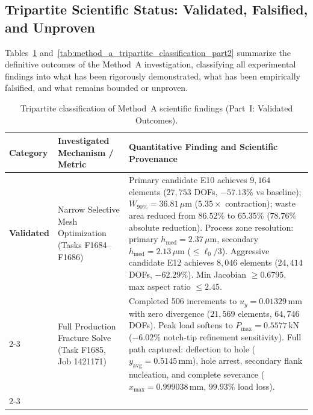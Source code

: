\subsection{Tripartite Scientific Status: Validated, Falsified, and Unproven}
\label{subsec:method_a_tripartite_status}

Tables~\ref{tab:method_a_tripartite_classification} and~\ref{tab:method_a_tripartite_classification_part2} summarize the definitive outcomes of the Method~A investigation, classifying all experimental findings into what has been rigorously demonstrated, what has been empirically falsified, and what remains bounded or unproven.

\begin{table}[htbp]
\centering
\footnotesize
\caption{Tripartite classification of Method~A scientific findings (Part~I: Validated Outcomes).}
\label{tab:method_a_tripartite_classification}
\begin{tabularx}{\textwidth}{p{2.2cm}p{3.8cm}X}
\hline
\textbf{Category} & \textbf{Investigated Mechanism / Metric} & \textbf{Quantitative Finding and Scientific Provenance} \\
\hline
\textbf{Validated} & Narrow Selective Mesh Optimization (Tasks F1684--F1686) & Primary candidate E10 achieves $9{,}164$ elements ($27{,}753$ DOFs, $-57.13\%$ vs baseline); $W_{90\%} = 36.81\,\mu\mathrm{m}$ ($5.35\times$ contraction); waste area reduced from $86.52\%$ to $65.35\%$ ($78.76\%$ absolute reduction). Process zone resolution: primary $h_{\mathrm{med}} = 2.37\,\mu\mathrm{m}$, secondary $h_{\mathrm{med}} = 2.13\,\mu\mathrm{m}$ ($\le \ell_0/3$). Aggressive candidate E12 achieves $8{,}046$ elements ($24{,}414$ DOFs, $-62.29\%$). Min Jacobian $\ge 0.6795$, max aspect ratio $\le 2.45$. \\
\cline{2-3}
 & Full Production Fracture Solve (Task F1685, Job 1421171) & Completed 506 increments to $u_y = 0.01329\,\mathrm{mm}$ with zero divergence ($21{,}569$ elements, $64{,}746$ DOFs). Peak load softens to $P_{\max} = 0.5577\,\mathrm{kN}$ ($-6.02\%$ notch-tip refinement sensitivity). Full path captured: deflection to hole ($y_{\mathrm{avg}} = 0.5145\,\mathrm{mm}$), hole arrest, secondary flank nucleation, and complete severance ($x_{\max} = 0.999038\,\mathrm{mm}$, $99.93\%$ load loss). \\
\cline{2-3}

\end{tabularx}
\end{table}
